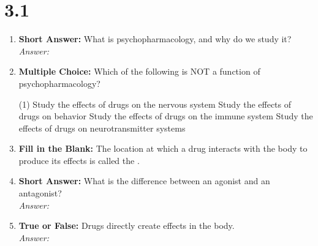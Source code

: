 



\section*{3.1}
\begin{enumerate}[label=\textbf{Q3.1.\arabic*}]
    \item \textbf{Short Answer:} What is psychopharmacology, and why do we study it? \\
        \textit{Answer:} %

    \item \textbf{Multiple Choice:} Which of the following is NOT a function of psychopharmacology?
        \begin{tasks}[label=\textcolor{\documentTheme}{(\Alph*)}, item-format=\color{\documentTheme}, label-width=1.5em, item-indent=1.7em](1)
            \task Study the effects of drugs on the nervous system
            \task Study the effects of drugs on behavior
            \task Study the effects of drugs on the immune system
            \task Study the effects of drugs on neurotransmitter systems
        \end{tasks}

    \item \textbf{Fill in the Blank:} The location at which a drug interacts with the body to produce its effects is called the \underline{\hspace{3cm}}.

    \item \textbf{Short Answer:} What is the difference between an agonist and an antagonist? \\
        \textit{Answer:} %

    \item \textbf{True or False:} Drugs directly create effects in the body. \\
        \textit{Answer:} %


\end{enumerate}
